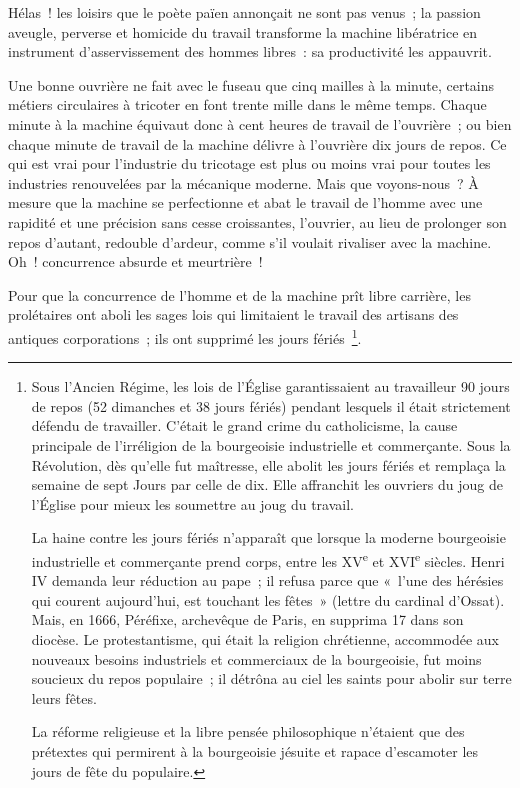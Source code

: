 \documentclass[french,twoside]{book} %
\begin{document}
\noindent Hélas ! les loisirs que le poète païen annonçait ne sont pas venus ; la passion aveugle, perverse et homicide du travail transforme la machine libératrice en instrument d’asservissement des hommes libres : sa productivité les appauvrit.\par
Une bonne ouvrière ne fait avec le fuseau que cinq mailles à la minute, certains métiers circulaires à tricoter en font trente mille dans le même temps. Chaque minute à la machine équivaut donc à cent heures de travail de l’ouvrière ; ou bien chaque minute de travail de la machine délivre à l’ouvrière dix jours de repos. Ce qui est vrai pour l’industrie du tricotage est plus ou moins vrai pour toutes les industries renouvelées par la mécanique moderne. Mais que voyons-nous ? À mesure que la machine se perfectionne et abat le travail de l’homme avec une rapidité et une précision sans cesse croissantes, l’ouvrier, au lieu de prolonger son repos d’autant, redouble d’ardeur, comme s’il voulait rivaliser avec la machine. Oh ! concurrence absurde et meurtrière !\par
Pour que la concurrence de l’homme et de la machine prît libre carrière, les prolétaires ont aboli les sages lois qui limitaient le travail des artisans des antiques corporations ; ils ont supprimé les jours fériés \footnote{ \noindent Sous l’Ancien Régime, les lois de l’Église garantissaient au travailleur 90 jours de repos (52 dimanches et 38 jours fériés) pendant lesquels il était strictement défendu de travailler. C’était le grand crime du catholicisme, la cause principale de l’irréligion de la bourgeoisie industrielle et commerçante. Sous la Révolution, dès qu’elle fut maîtresse, elle abolit les jours fériés et remplaça la semaine de sept Jours par celle de dix. Elle affranchit les ouvriers du joug de l’Église pour mieux les soumettre au joug du travail.\par
 La haine contre les jours fériés n’apparaît que lorsque la moderne bourgeoisie industrielle et commerçante prend corps, entre les XV\textsuperscript{e} et XVI\textsuperscript{e} siècles. Henri IV demanda leur réduction au pape ; il refusa parce que « l’une des hérésies qui courent aujourd’hui, est touchant les fêtes » (lettre du cardinal d’Ossat). Mais, en 1666, Péréfixe, archevêque de Paris, en supprima 17 dans son diocèse. Le protestantisme, qui était la religion chrétienne, accommodée aux nouveaux besoins industriels et commerciaux de la bourgeoisie, fut moins soucieux du repos populaire ; il détrôna au ciel les saints pour abolir sur terre leurs fêtes.\par
 La réforme religieuse et la libre pensée philosophique n’étaient que des prétextes qui permirent à la bourgeoisie jésuite et rapace d’escamoter les jours de fête du populaire.
 }.\par
\end{document}
